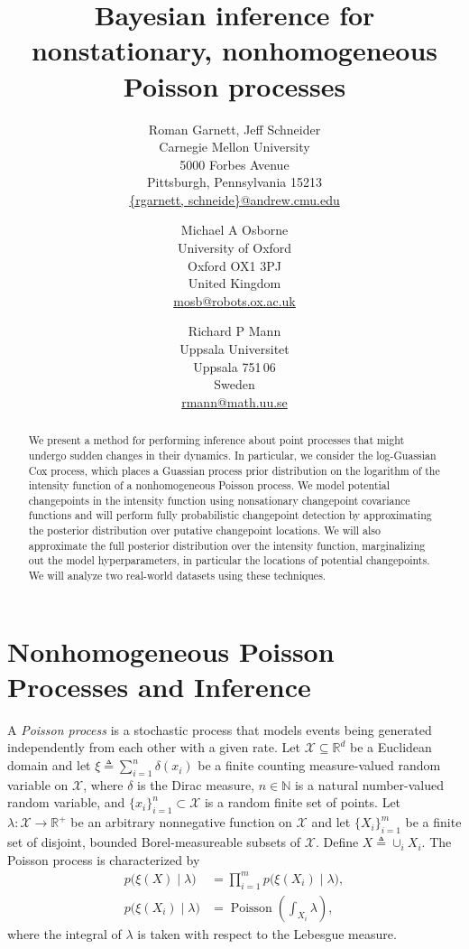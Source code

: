 \documentclass{article}
\title{Bayesian inference for nonstationary, nonhomogeneous Poisson
  processes}
\author{
  Roman Garnett, Jeff Schneider\\
  {Carnegie Mellon University}\\
  {5000 Forbes Avenue}\\
  {Pittsburgh, Pennsylvania 15213}\\
  \url{{rgarnett, schneide}@andrew.cmu.edu}
  \and
  Michael A Osborne\\
  {University of Oxford}\\
  {Oxford OX1 3PJ}\\
  {United Kingdom}\\
\url{mosb@robots.ox.ac.uk}
  \and
  Richard P Mann\\
  {Uppsala Universitet}\\
  {Uppsala 751\,06}\\
  {Sweden}\\
  \url{rmann@math.uu.se}
}
\newcommand{\deq}{\triangleq}
\newcommand{\cm}[1]{\mathcal{#1}}
\newcommand{\given}{\mid}
\newcommand{\R}{\mathbb{R}}
\newcommand{\N}{\mathbb{N}}
\DeclareMathOperator{\poisson}{Poisson}
\begin{document}
\maketitle

\begin{abstract}
  We present a method for performing inference about point processes
  that might undergo sudden changes in their dynamics.  In particular,
  we consider the log-Guassian Cox process, which places a Guassian
  process prior distribution on the logarithm of the intensity
  function of a nonhomogeneous Poisson process.  We model potential
  changepoints in the intensity function using nonsationary
  changepoint covariance functions and will perform fully
  probabilistic changepoint detection by approximating the posterior
  distribution over putative changepoint locations.  We will also
  approximate the full posterior distribution over the intensity
  function, marginalizing out the model hyperparameters, in particular
  the locations of potential changepoints.  We will analyze two
  real-world datasets using these techniques.
\end{abstract}

\section{Nonhomogeneous Poisson Processes and Inference}

A \emph{Poisson process} is a stochastic process that models events
being generated independently from each other with a given rate.  Let
$\cm{X} \subseteq \R^d$ be a Euclidean domain and let $\xi \deq
\sum_{i = 1}^n \delta(x_i)$ be a finite counting measure-valued random
variable on $\cm{X}$, where $\delta$ is the Dirac measure, $n \in \N$
is a natural number-valued random variable, and $\lbrace x_i
\rbrace_{i = 1}^n \subset \cm{X}$ is a random finite set of points.
Let $\lambda\colon \cm{X} \to \R^+$ be an arbitrary nonnegative
function on $\cm{X}$ and let $\lbrace X_i \rbrace_{i = 1}^m$ be a
finite set of disjoint, bounded Borel-measureable subsets of $\cm{X}$.
Define $X \deq \cup_i X_i$.  The Poisson process is characterized by
\begin{align}
  p\bigl(\xi(X) \given \lambda \bigr) 
  &= 
  \prod_{i=1}^m p\bigl(\xi(X_i)\given \lambda \bigr),
  \nonumber
  \\
  p\bigl(\xi(X_i) \given \lambda \bigr)
  &=
  \poisson\left( \textstyle \int_{X_i} \lambda \right),
  \label{realprobability}
\end{align}
where the integral of $\lambda$ is taken with respect to the Lebesgue
measure.
\end{document}
